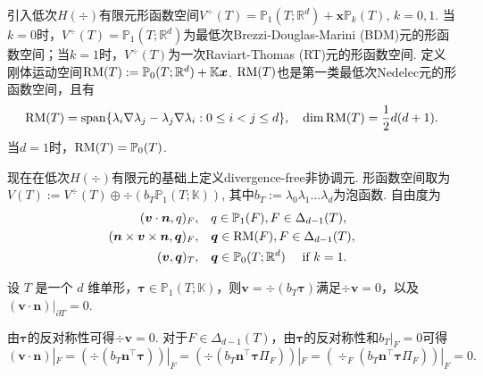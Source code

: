 引入低次$H(\div)$有限元形函数空间$V^{\div}(T)=\mathbb P_1(T;\mathbb R^d)+\boldsymbol{x}\mathbb P_k(T)$, $k=0,1$. 当$k=0$时，$V^{\div}(T)=\mathbb P_1(T;\mathbb R^d)$为最低次Brezzi-Douglas-Marini (BDM)元\cite{BrezziDouglasMarini1985,BrezziDouglasDuranFortin1987,Nedelec1986}的形函数空间；当$k=1$时，$V^{\div}(T)$为一次Raviart-Thomas (RT)元\cite{RaviartThomas1977,Nedelec1980,ChenHuang2022}的形函数空间. 定义刚体运动空间${\rm RM}(T):=\mathbb P_0(T;\mathbb R^d)+\mathbb K\boldsymbol{x}$. ${\rm RM}(T)$也是第一类最低次Nedelec元的形函数空间\cite{Nedelec1980}，且有
\begin{equation*}
{\rm RM}(T)={\rm span}\{\lambda_i\nabla \lambda_j-\lambda_j\nabla \lambda_i: 0\leq i<j\leq d\}, \quad\dim{\rm RM}(T)=\frac{1}{2}d(d+1).
\end{equation*}
当$d=1$时，${\rm RM}(T)=\mathbb P_0(T)$.


现在在低次$H(\div)$有限元的基础上定义divergence-free非协调元. 形函数空间取为$V(T):=V^{\div}(T)\oplus\div(b_T\mathbb P_1(T;\mathbb K))$, 其中$b_T:=\lambda_0\lambda_1\ldots\lambda_d$为泡函数.
自由度为
\begin{subequations}\label{divfreencfmDoFs}
\begin{align}
\label{divfreencfmDoFs1}
(\boldsymbol{v}\cdot\boldsymbol{n}, q)_F, &\quad q\in\mathbb P_{1}(F), F\in\Delta_{d-1}(T),\\
\label{divfreencfmDoFs2}
(\boldsymbol{n}\times\boldsymbol{v}\times\boldsymbol{n}, \boldsymbol{q})_F, &\quad \boldsymbol{q}\in{\rm RM}(F), F\in\Delta_{d-1}(T),\\
\label{divfreencfmDoFs3}
(\boldsymbol{v}, \boldsymbol{q})_T, &\quad \boldsymbol{q}\in\mathbb P_{0}(T;\mathbb R^d)\quad\textrm{ if } k=1.
\end{align}
\end{subequations}

\begin{lemma}
设 $T$ 是一个 $d$ 维单形，$\boldsymbol{\tau}\in\mathbb P_1(T;\mathbb K)$，则$\boldsymbol{v}=\div(b_T\boldsymbol{\tau})$满足$\div\boldsymbol{v}=0$，以及$(\boldsymbol{v}\cdot\boldsymbol{n})|_{\partial T}=0$.
\end{lemma}
\begin{prf}
由$\boldsymbol{\tau}$的反对称性可得$\div\boldsymbol{v}=0$. 对于$F\in\Delta_{d-1}(T)$，由$\boldsymbol{\tau}$的反对称性和$b_T|_F=0$可得
\begin{equation*}
(\boldsymbol{v}\cdot\boldsymbol{n})|_{F}=(\div(b_T\boldsymbol{n}^{\intercal}\boldsymbol{\tau}))|_{F}=(\div(b_T\boldsymbol{n}^{\intercal}\boldsymbol{\tau}\Pi_F))|_{F}=(\div_F(b_T\boldsymbol{n}^{\intercal}\boldsymbol{\tau}\Pi_F))|_{F}=0.
\end{equation*}
\end{prf}

